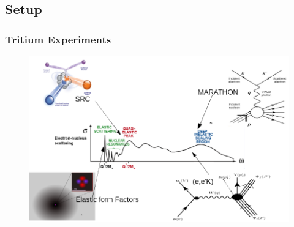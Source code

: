 \documentclass{beamer}
\begin{document}
\subsection{Setup}
\begin{frame}
\frametitle{Tritium Experiments}
	\vspace{-15pt}
	\begin{figure}
		\includegraphics[width =12cm]{../images/tritium_ov}
	\end{figure}
\end{frame}
\end{document}
